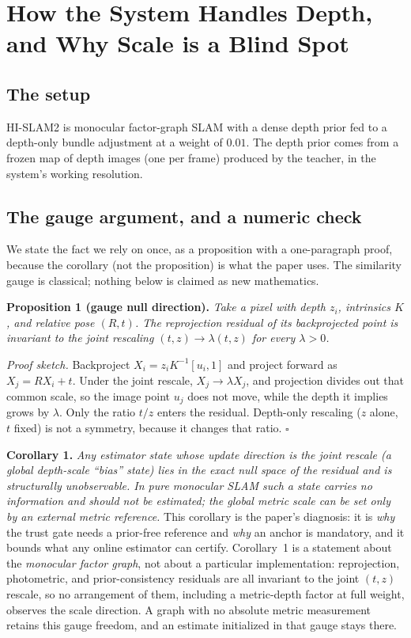 \section{How the System Handles Depth, and Why Scale is a Blind Spot}

\subsection{The setup}

HI-SLAM2 is monocular factor-graph SLAM with a dense depth prior fed to a
depth-only bundle adjustment at a weight of $0.01$. The depth prior comes from a frozen map of
depth images (one per frame) produced by the teacher, in the system's working
resolution.

\subsection{The gauge argument, and a numeric check}
\label{sec:gauge}

We state the fact we rely on once, as a proposition with a one-paragraph proof,
because the corollary (not the proposition) is what the paper uses. The
similarity gauge is classical; nothing below is claimed as new mathematics.

\medskip
\noindent\textbf{Proposition 1 (gauge null direction).} \emph{Take a pixel with
depth $z_i$, intrinsics $K$, and relative pose $(R,t)$. The reprojection residual
of its backprojected point is invariant to the joint rescaling
$(t,z)\to\lambda(t,z)$ for every $\lambda>0$.}

\smallskip
\noindent\emph{Proof sketch.} Backproject $X_i = z_i K^{-1}[u_i,1]$ and project
forward as $X_j = R X_i + t$. Under the joint rescale, $X_j \to \lambda X_j$, and
projection divides out that common scale, so the image point $u_j$ does not move,
while the depth it implies grows by $\lambda$. Only the ratio $t/z$ enters
the residual. Depth-only rescaling ($z$ alone, $t$ fixed) is not a symmetry,
because it changes that ratio. \hfill$\square$

\smallskip
\noindent\textbf{Corollary 1.} \emph{Any estimator state whose update direction is
the joint rescale (a global depth-scale ``bias'' state) lies in the exact
null space of the residual and is structurally unobservable. In pure monocular
SLAM such a state carries no information and should not be estimated; the global
metric scale can be set only by an external metric reference.} This corollary is
the paper's diagnosis: it is \emph{why} the trust gate needs a prior-free
reference and \emph{why} an anchor is mandatory, and it bounds what any online
estimator can certify. Corollary~1 is a statement about the \emph{monocular factor
graph}, not about a particular implementation: reprojection, photometric, and
prior-consistency residuals are all invariant to the joint $(t,z)$ rescale, so no
arrangement of them, including a metric-depth factor at full weight, observes
the scale direction. A graph with no absolute metric measurement retains this
gauge freedom, and an estimate initialized in that gauge stays there.

